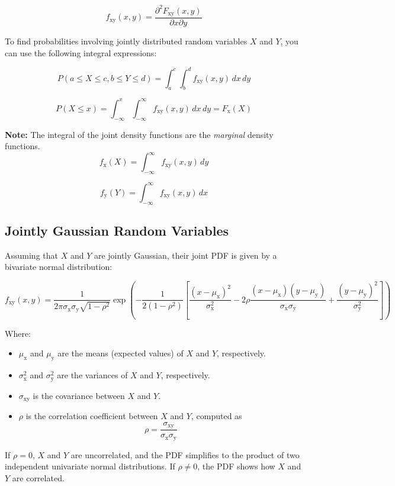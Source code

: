 \documentclass[12pt]{book}
\theoremstyle{definition}
\begin{document}
\[
f_\mathrm{xy}(x, y) = \frac{\partial^2 F_\mathrm{xy}(x, y)}{\partial x \partial y}
\]

To find probabilities involving jointly distributed random variables \(X\) and \(Y\), you can use the following integral expressions:

\[
P(a \leq X \leq c, b \leq Y \leq d) = \int_a^c \int_b^d f_\mathrm{xy}(x, y) \,  dx \, dy
\]

\[
P(X \le x) = \int_{-\infty}^x \int_{-\infty}^{\infty} f_\mathrm{xy}(x, y) \, dx  \,dy  = F_\mathrm{x}(X)
\]

\bigskip

\textbf{Note:} The integral of the joint density functions are the \emph{marginal} density functions. 
\[
f_\mathrm{x}(X) = \int_{-\infty}^\infty f_\mathrm{xy}(x, y)  \, dy
\]

\[
f_\mathrm{y}(Y) = \int_{-\infty}^\infty f_\mathrm{xy}(x, y) \, dx
\]

\subsection{Jointly Gaussian Random Variables}


Assuming that $X$ and $Y$ are jointly Gaussian, their joint PDF is given by a bivariate normal distribution:

\[
f_\mathrm{xy}(x, y) = \frac{1}{2\pi\sigma_\mathrm{x}\sigma_\mathrm{y}\sqrt{1-\rho^2}} \exp\left(-\frac{1}{2(1-\rho^2)}\left[\frac{(x-\mu_\mathrm{x})^2}{\sigma_\mathrm{x}^2} - 2\rho\frac{(x-\mu_\mathrm{x})(y-\mu_\mathrm{y})}{\sigma_\mathrm{x}\sigma_\mathrm{y}} + \frac{(y-\mu_\mathrm{y})^2}{\sigma_\mathrm{y}^2}\right]\right)
\]

Where:
\begin{itemize}
    \item $\mu_\mathrm{x}$ and $\mu_\mathrm{y}$ are the means (expected values) of $X$ and $Y$, respectively.
    \item $\sigma_\mathrm{x}^2$ and $\sigma_\mathrm{y}^2$ are the variances of $X$ and $Y$, respectively.
    \item $\sigma_\mathrm{xy}$ is the covariance between $X$ and $Y$.
    \item $\rho$ is the correlation coefficient between $X$ and $Y$, computed as 
    \[
    \rho = \frac{\sigma_\mathrm{xy}}{\sigma_\mathrm{x} \sigma_\mathrm{y}}
    \]
\end{itemize}

If $\rho = 0$, $X$ and $Y$ are uncorrelated, and the PDF simplifies to the product of two independent univariate normal distributions. If $\rho \neq 0$, the PDF shows how $X$ and $Y$ are correlated.\\
\end{document}
